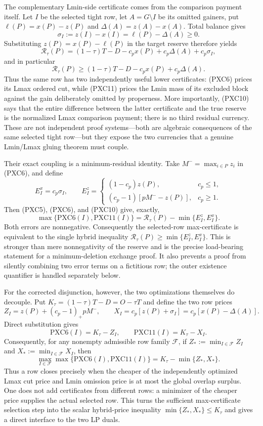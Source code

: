 \documentclass[11pt]{article}
\begin{document}
The complementary Lmin-side certificate comes from the comparison payment
itself.  Let $I$ be the selected tight row, let
$A=G\setminus I$ be its omitted gainers, put
$\ell(P)=x(P)-z(P)$ and $\Delta(A)=z(A)-x(A)$.  Total balance gives
\[
 \sigma_I:=z(I)-x(I)=\ell(P)-\Delta(A)\ge0.        \tag{PXC9}
\]
Substituting $z(P)=x(P)-\ell(P)$ in the target reserve therefore yields
\[
 \mathcal R_\tau(P)
 =(1-\tau)T-D-c_p x(P)+c_p\Delta(A)+c_p\sigma_I,  \tag{PXC10}
\]
and in particular
\[
 \mathcal R_\tau(P)
 \ge (1-\tau)T-D-c_p x(P)+c_p\Delta(A).            \tag{PXC11}
\]
Thus the same row has two independently useful lower certificates: (PXC6)
prices its Lmax ordered cut, while (PXC11) prices the Lmin mass of its
excluded block against the gain deliberately omitted by properness.  More
importantly, (PXC10) says that the entire difference between the latter
certificate and the true reserve is the normalized Lmax comparison payment;
there is no third residual currency.  These
are not independent proof systems---both are algebraic consequences of the
same selected tight row---but they expose the two currencies that a genuine
Lmin/Lmax gluing theorem must couple.

Their exact coupling is a minimum-residual identity.  Take
$M^-=\max_{i\in P}z_i$ in (PXC6), and define
\[
 E_I^x=c_p\sigma_I,\qquad
 E_I^z=
 \begin{cases}
 (1-c_p)z(P),&c_p\le1,\\
 (c_p-1)[pM^--z(P)],&c_p\ge1.
 \end{cases}
\]
Then (PXC5), (PXC6), and (PXC10) give, exactly,
\[
 \max\{\mathrm{PXC6}(I),\mathrm{PXC11}(I)\}
 =\mathcal R_\tau(P)-\min\{E_I^z,E_I^x\}.          \tag{PXC12}
\]
Both errors are nonnegative.  Consequently the selected-row max-certificate
is equivalent to the single hybrid inequality
$\mathcal R_\tau(P)\ge\min\{E_I^z,E_I^x\}$.  This is stronger than mere
nonnegativity of the reserve and is the precise load-bearing statement for a
minimum-deletion exchange proof.  It also prevents a proof from silently
combining two error terms on a fictitious row; the outer existence
quantifier is handled separately below.

For the corrected disjunction, however, the two optimizations themselves do
decouple.  Put $K_\tau=(1-\tau)T-D=O-\tau T$ and define the two row prices
\[
 Z_I=z(P)+(c_p-1)_+pM^-,\qquad
 X_I=c_p[z(P)+\sigma_I]=c_p[x(P)-\Delta(A)].
\]
Direct substitution gives
\[
 \mathrm{PXC6}(I)=K_\tau-Z_I,\qquad
 \mathrm{PXC11}(I)=K_\tau-X_I.                    \tag{PXC13}
\]
Consequently, for any nonempty admissible row family $\mathcal F$, if
$Z_*:=\min_{I\in\mathcal F}Z_I$ and
$X_*:=\min_{I\in\mathcal F}X_I$, then
\[
 \max_{I\in\mathcal F}\max\{\mathrm{PXC6}(I),\mathrm{PXC11}(I)\}
 =K_\tau-\min\{Z_*,X_*\}.                          \tag{PXC14}
\]
Thus a row closes precisely when the cheaper of the independently optimized
Lmax cut price and Lmin omission price is at most the global overlap surplus.
One does not add certificates from different rows: a minimizer of the cheaper
price supplies the actual selected row.  This turns the sufficient
max-certificate selection step into the scalar hybrid-price inequality
$\min\{Z_*,X_*\}\le K_\tau$ and gives a direct interface to the two LP
duals.
\end{document}
